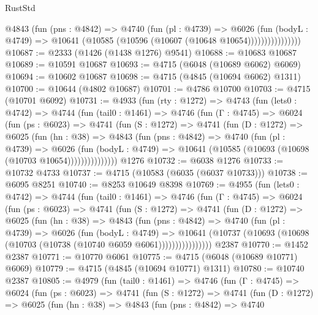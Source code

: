\begin{lexlean}{RustStd}
\begin{coremodule}
                    @4843
                      (fun (pns : @4842) =>
                      @4740
                        (fun (pl : @4739) =>
                        @6026
                          (fun (bodyL : @4749) =>
                          @10641 (@10585 (@10596 (@10607 (@10648 @10654))))))))))))))))
@10687 := @2333 (@1426 (@1438 @1276) @9541)
@10688 := @10683 @10687
@10689 := @10591 @10687
@10693 := @4715 (@6048 (@10689 @6062) @6069)
@10694 := @10602 @10687
@10698 := @4715 (@4845 (@10694 @6062) @1311)
@10700 := @10644 (@4802 @10687)
@10701 := @4786 @10700
@10703 := @4715 (@10701 @6092)
@10731 := @4933
    (fun (rty : @1272) =>
    @4743
      (fun (lets0 : @4742) =>
      @4744
        (fun (tail0 : @1461) =>
        @4746
          (fun (Γ : @4745) =>
          @6024
            (fun (ps : @6023) =>
            @4741
              (fun (S : @1272) =>
              @4741
                (fun (D : @1272) =>
                @6025
                  (fun (hn : @38) =>
                  @4843
                    (fun (pns : @4842) =>
                    @4740
                      (fun (pl : @4739) =>
                      @6026
                        (fun (bodyL : @4749) =>
                        @10641 (@10585 (@10693 (@10698 (@10703 @10654)))))))))))))))
    @1276
@10732 := @6038 @1276
@10733 := @10732 @4733
@10737 := @4715 (@10583 (@6035 (@6037 @10733)))
@10738 := @6095 @8251
@10740 := @8253 @10649 @8398
@10769 := @4955
    (fun (lets0 : @4742) =>
    @4744
      (fun (tail0 : @1461) =>
      @4746
        (fun (Γ : @4745) =>
        @6024
          (fun (ps : @6023) =>
          @4741
            (fun (S : @1272) =>
            @4741
              (fun (D : @1272) =>
              @6025
                (fun (hn : @38) =>
                @4843
                  (fun (pns : @4842) =>
                  @4740
                    (fun (pl : @4739) =>
                    @6026
                      (fun (bodyL : @4749) =>
                      @10641
                        (@10737 (@10693 (@10698 (@10703 (@10738 (@10740 @6059 @6061))))))))))))))))
    @2387
@10770 := @1452 @2387
@10771 := @10770 @6061
@10775 := @4715 (@6048 (@10689 @10771) @6069)
@10779 := @4715 (@4845 (@10694 @10771) @1311)
@10780 := @10740 @2387
@10805 := @4979
    (fun (tail0 : @1461) =>
    @4746
      (fun (Γ : @4745) =>
      @6024
        (fun (ps : @6023) =>
        @4741
          (fun (S : @1272) =>
          @4741
            (fun (D : @1272) =>
            @6025
              (fun (hn : @38) =>
              @4843
                (fun (pns : @4842) =>
                @4740

\end{coremodule}
\end{lexlean}
